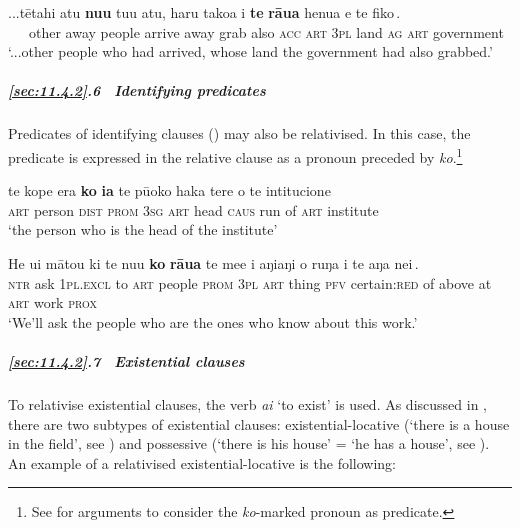 \ea\label{ex:11.102}
\gll ...tētahi atu \textbf{nu{\ꞌ}u} tu{\ꞌ}u atu, {\ob}haru tako{\ꞌ}a i \textbf{te} \textbf{rāua} henua e te fiko\,{\cb}.\\
~~~other away people arrive away {\db}grab also \textsc{acc} \textsc{art} \textsc{3pl} land \textsc{ag} \textsc{art} government\\

\glt 
‘...other people who had arrived, whose land the government had also grabbed.’ \textstyleExampleref{[R649.055]} 
\z

\subparagraph{\ref{sec:11.4.2}.6~ Identifying predicates} Predicates of identifying clauses () may also be relativised. In this case, the predicate is expressed in the relative clause as a pronoun preceded by \textit{ko}.\footnote{\label{fn:513}See  for arguments to consider the \textit{ko}{}-marked pronoun as predicate.} 

\ea\label{ex:11.103}
\gll te kope era {\ob}\textbf{ko} \textbf{ia} te pū{\ꞌ}oko haka tere o te intitucione\,{\cb} \\
\textsc{art} person \textsc{dist} {\db}\textsc{prom} \textsc{3sg} \textsc{art} head \textsc{caus} run of \textsc{art} institute \\

\glt 
‘the person who is the head of the institute’ \textstyleExampleref{[R647.143]} 
\z

\ea\label{ex:11.104}
\gll He {\ꞌ}ui mātou ki te nu{\ꞌ}u {\ob}\textbf{ko} \textbf{rāua} te me{\ꞌ}e i aŋiaŋi o ruŋa i te aŋa nei\,{\cb}.\\
\textsc{ntr} ask \textsc{1pl.excl} to \textsc{art} people {\db}\textsc{prom} \textsc{3pl} \textsc{art} thing \textsc{pfv} certain:\textsc{red} of above at \textsc{art} work \textsc{prox}\\

\glt 
‘We’ll ask the people who are the ones who know about this work.’ \textstyleExampleref{[R535.193]} 
\z

\subparagraph{\ref{sec:11.4.2}.7~ Existential clauses} To relativise existential clauses, the verb \textit{ai} ‘to exist’ is used. As discussed in , there are two subtypes of existential clauses: existential-locative (‘there is a house in the field’, see ) and possessive (‘there is his house’ = ‘he has a house’, see ). An example of a relativised existential-locative is the following:

